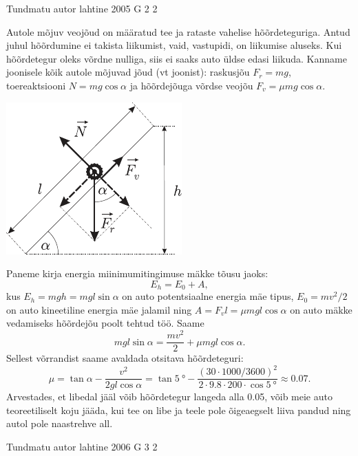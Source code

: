 \documentclass[11pt]{article}
\begin{document}
{{\fi
}

{Tundmatu autor} %
{lahtine} %
{2005} %
{G 2} %
{2} %
{

\ifSolution
Autole mõjuv veojõud on määratud tee ja rataste vahelise hõõrdeteguriga. Antud juhul hõõrdumine ei takista liikumist, vaid, vastupidi, on liikumise aluseks. Kui hõõrdetegur oleks võrdne nulliga, siis ei saaks auto üldse edasi liikuda. Kanname joonisele kõik autole mõjuvad jõud (vt joonist): raskusjõu $F_r = mg$, toereaktsiooni $N = mg \cos \alpha$ ja hõõrdejõuga võrdse veojõu $F_v = \mu mg \cos \alpha$.

\begin{center}
	\includegraphics[width=0.5\linewidth]{2005-lahg-02-lah}
\end{center}

Paneme kirja energia miinimumitingimuse mäkke tõusu jaoks:
\[
E_h = E_0 + A,
\]
kus $E_h = mgh = mgl\sin \alpha$ on auto potentsiaalne energia mäe tipus, $E_0 = mv^2/2$ on auto kineetiline energia mäe jalamil ning $A = F_vl = \mu mgl \cos \alpha$ on auto mäkke vedamiseks hõõrdejõu poolt tehtud töö. Saame
\[
m g l \sin \alpha=\frac{m v^{2}}{2}+\mu m g l \cos \alpha.
\]
Sellest võrrandist saame avaldada otsitava hõõrdeteguri:
\[
\mu=\tan \alpha-\frac{v^{2}}{2 g l \cos \alpha}=\tan \SI{5}{\degree}-\frac{(\num{30} \cdot \num{1000} / \num{3600})^{2}}{\num{2} \cdot \num{9,8} \cdot \num{200} \cdot \cos \SI{5}{\degree}} \approx \num{0,07}.
\]
Arvestades, et libedal jääl võib hõõrdetegur langeda alla \num{0,05}, võib meie auto teoreetiliselt koju jääda, kui tee on libe ja teele pole õigeaegselt liiva pandud ning autol pole naastrehve all.
\fi
}

{Tundmatu autor} %
{lahtine} %
{2006} %
{G 3} %
{2} %
{

}}
\end{document}
